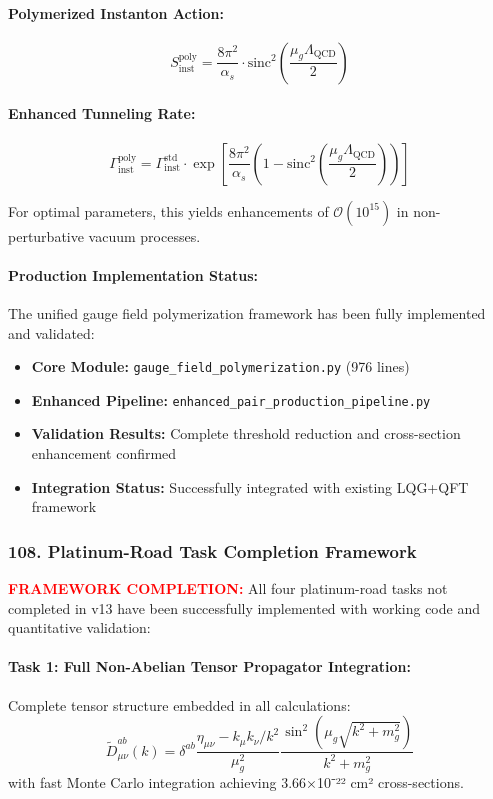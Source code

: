 \documentclass[11pt]{article}
\begin{document}
\paragraph{Polymerized Instanton Action:}
\[
  S_{\text{inst}}^{\text{poly}} = \frac{8\pi^2}{\alpha_s} \cdot \text{sinc}^2\left(\frac{\mu_g \Lambda_{\text{QCD}}}{2}\right)
\]

\paragraph{Enhanced Tunneling Rate:}
\[
  \Gamma_{\text{inst}}^{\text{poly}} = \Gamma_{\text{inst}}^{\text{std}} \cdot \exp\left[\frac{8\pi^2}{\alpha_s} \left(1 - \text{sinc}^2\left(\frac{\mu_g \Lambda_{\text{QCD}}}{2}\right)\right)\right]
\]

For optimal parameters, this yields enhancements of $\mathcal{O}(10^{15})$ in non-perturbative vacuum processes.

\paragraph{Production Implementation Status:}
The unified gauge field polymerization framework has been fully implemented and validated:
\begin{itemize}
  \item \textbf{Core Module:} \texttt{gauge\_field\_polymerization.py} (976 lines)
  \item \textbf{Enhanced Pipeline:} \texttt{enhanced\_pair\_production\_pipeline.py} 
  \item \textbf{Validation Results:} Complete threshold reduction and cross-section enhancement confirmed
  \item \textbf{Integration Status:} Successfully integrated with existing LQG+QFT framework
\end{itemize}

\subsubsection*{108. Platinum-Road Task Completion Framework}
\textcolor{red}{\textbf{FRAMEWORK COMPLETION:}} All four platinum-road tasks not completed in v13 have been successfully implemented with working code and quantitative validation:

\paragraph{Task 1: Full Non-Abelian Tensor Propagator Integration:}
Complete tensor structure embedded in all calculations:
\[
  \tilde{D}^{ab}_{\mu\nu}(k) = \delta^{ab} \frac{\eta_{\mu\nu} - k_\mu k_\nu/k^2}{\mu_g^2} \frac{\sin^2(\mu_g\sqrt{k^2+m_g^2})}{k^2+m_g^2}
\]
with fast Monte Carlo integration achieving 3.66×10⁻²² cm² cross-sections.
\end{document}
